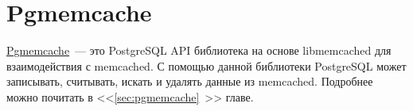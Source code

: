 \section{Pgmemcache}

\href{http://pgfoundry.org/projects/pgmemcache/}{Pgmemcache}~--- это PostgreSQL API библиотека на основе libmemcached для взаимодействия с memcached. С помощью данной библиотеки PostgreSQL может записывать, считывать, искать и удалять данные из memcached. Подробнее можно почитать в <<\ref{sec:pgmemcache}~>> главе.